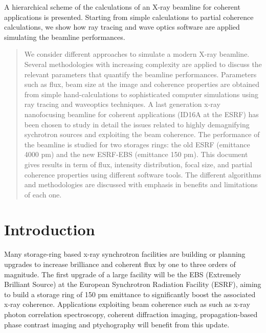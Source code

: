 \documentclass{iucr}              %
\begin{document}


\maketitle                        %

\begin{synopsis}
A hierarchical scheme of the calculations of an X-ray beamline for coherent applications is presented. Starting from simple calculations to partial coherence calculations, we show how ray tracing and wave optics software are applied simulating the beamline performances.   
\end{synopsis}

\begin{abstract}
We consider different approaches to simulate a modern X-ray beamline. Several methodologies with increasing complexity are applied to discuss the relevant parameters that quantify the beamline performances. Parameters such as flux, beam size at the image and coherence properties are obtained from simple hand-calculations to sophisticated computer simulations using ray tracing and waveoptics techniques. A last generation x-ray nanofocusing beamline for coherent  applications (ID16A at the ESRF) has been chosen  to study in detail the issues 
related to highly demagnifying sychrotron sources and exploiting the beam coherence. The performance of the beamline is studied for two storages rings: the old ESRF (emittance 4000 pm) and the new ESRF-EBS (emittance 150 pm). This document gives results in term of flux, intensity distribution, focal size, and partial coherence properties using different software tools. The different algorithms and methodologies are discussed with emphasis in benefits and limitations of each one. 
\end{abstract}


     
\section{Introduction}


Many storage-ring based x-ray synchrotron facilities are building or planning upgrades to increase brilliance and coherent flux by one to three orders of magnitude.  The first upgrade of a large facility will be the EBS (Extremely Brilliant Source) \cite{orangebook} at the European Synchrotron Radiation Facility (ESRF), aiming to build a storage ring of 150 pm emittance to significantly boost the associated x-ray coherence. Applications exploiting beam coherence such as such as x-ray photon correlation spectroscopy, coherent diffraction imaging, propagation-based phase contrast imaging and ptychography will benefit from this update.  
\end{document}
